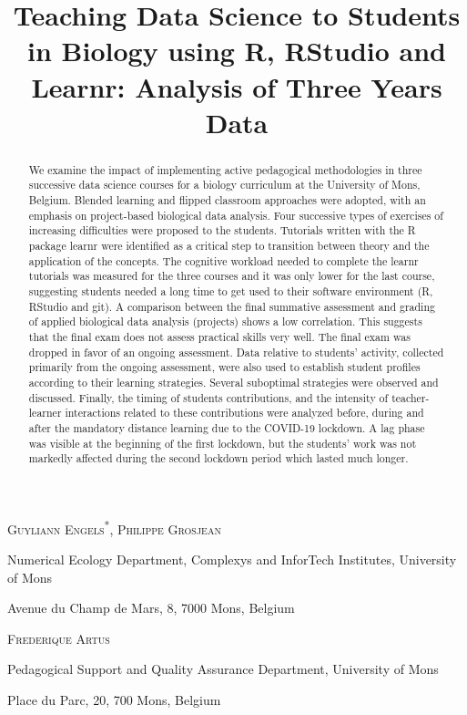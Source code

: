 \documentclass{aims}
\title[Teaching Data Science in
Biology] %
      {Teaching Data Science to Students in Biology using R, RStudio and
Learnr: Analysis of Three Years Data}
\author[Guyliann Engels, Philippe Grosjean and Frédérique Artus]{}
\theoremstyle{definition}
\begin{document}
\maketitle

\centerline{\scshape Guyliann Engels\textsuperscript{*}, Philippe Grosjean}
\medskip
{\footnotesize
 \centerline{Numerical Ecology Department, Complexys and InforTech Institutes, University of Mons}
   \centerline{Avenue du Champ de Mars, 8, 7000 Mons, Belgium}
} %

\medskip

\centerline{\scshape Frederique Artus}

\medskip
{\footnotesize
 \centerline{ Pedagogical Support and Quality Assurance Department, University of Mons}
   \centerline{Place du Parc, 20, 700 Mons, Belgium}
}

\bigskip



\begin{abstract}
  We examine the impact of implementing active pedagogical methodologies
  in three successive data science courses for a biology curriculum at
  the University of Mons, Belgium. Blended learning and flipped
  classroom approaches were adopted, with an emphasis on project-based
  biological data analysis. Four successive types of exercises of
  increasing difficulties were proposed to the students. Tutorials
  written with the R package learnr were identified as a critical step
  to transition between theory and the application of the concepts. The
  cognitive workload needed to complete the learnr tutorials was
  measured for the three courses and it was only lower for the last
  course, suggesting students needed a long time to get used to their
  software environment (R, RStudio and git). A comparison between the
  final summative assessment and grading of applied biological data
  analysis (projects) shows a low correlation. This suggests that the
  final exam does not assess practical skills very well. The final exam
  was dropped in favor of an ongoing assessment. Data relative to
  students' activity, collected primarily from the ongoing assessment,
  were also used to establish student profiles according to their
  learning strategies. Several suboptimal strategies were observed and
  discussed. Finally, the timing of students contributions, and the
  intensity of teacher-learner interactions related to these
  contributions were analyzed before, during and after the mandatory
  distance learning due to the COVID-19 lockdown. A lag phase was
  visible at the beginning of the first lockdown, but the students' work
  was not markedly affected during the second lockdown period which
  lasted much longer.
\end{abstract}
\end{document}

